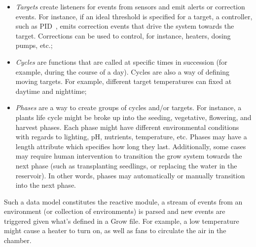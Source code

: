 \begin{itemize}
\item \emph{Targets} create listeners for events from sensors and emit alerts or correction events. For instance,
if an ideal threshold is specified for a target, a controller, such as PID~\cite{rivera1986internal}, emits correction events that drive the system towards the target.
Corrections can be used to control, for instance, heaters, dosing pumps, etc.;

\item \emph{Cycles} are functions that are called at specific times in succession (for example, during the course of a day).
Cycles are also a way of defining moving targets. For example, different target 
temperatures can fixed at daytime and nighttime;

\item \emph{Phases} are a way to create groups of cycles and/or targets.
For instance, a plants life cycle might be broke up into the seeding, vegetative, flowering, and harvest phases.
Each phase might have different environmental conditions with regards to lighting, pH, nutrients, temperature, etc.
Phases may have a length attribute which specifies how long they last. Additionally, some cases may require human intervention to transition the grow system towards the next phase (such as transplanting seedlings, or replacing the water in the reservoir). In other words, phases may automatically or manually transition into the next phase.

\end{itemize}

Such a data model constitutes the reactive module, a stream of events from an environment (or collection of environments) is parsed and new events are triggered given what's defined in a Grow file. For example, a low temperature might cause a heater to turn on, as well as fans to circulate the air in the chamber.